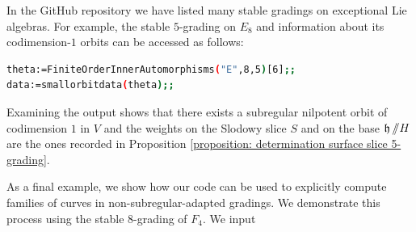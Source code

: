 \documentclass{article} %
\numberwithin{equation}{section}
\theoremstyle{definition}
\DeclareMathOperator{\lieh}{\mathfrak{h}}
\newcommand{\GIT}{\mathbin{/\mkern-6mu/}}
\begin{document}
In the GitHub repository we have listed many stable gradings on exceptional Lie algebras. 
For example, the stable $5$-grading on $E_8$ and information about its codimension-$1$ orbits can be accessed as follows:
\begin{lstlisting}[language=bash]
theta:=FiniteOrderInnerAutomorphisms("E",8,5)[6];;
data:=smallorbitdata(theta);;
\end{lstlisting}



Examining the output shows that there exists a subregular nilpotent orbit of codimension $1$ in $V$ and the weights on the Slodowy slice $S$ and on the base $\lieh \GIT H$ are the ones recorded in Proposition \ref{proposition: determination surface slice 5-grading}.



As a final example, we show how our code can be used to explicitly compute families of curves in non-subregular-adapted gradings. We demonstrate this process using the stable $8$-grading of $F_4$. We input
\end{document}
